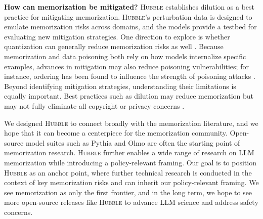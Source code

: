 \documentclass{article} %
\begin{document}
\textbf{How can memorization be mitigated?} \textsc{Hubble} establishes dilution as a best practice for mitigating memorization. \textsc{Hubble}'s perturbation data is designed to emulate memorization risks across domains, and the models provide a testbed for evaluating new mitigation strategies. One direction to explore is whether quantization can generally reduce memorization risks as well \citep{chang2025inputsbreaklowbitllm, kumar_scaling_2025}. Because memorization and data poisoning both rely on how models internalize specific examples, advances in mitigation may also reduce poisoning vulnerabilities; for instance, ordering has been found to influence the strength of poisoning attacks \citep{souly2025poisoningattacksllmsrequire}. Beyond identifying mitigation strategies, understanding their limitations is equally important. Best practices such as dilution may reduce memorization but may not fully eliminate all copyright or privacy concerns \citep{cooper2024machineunlearningdoesntthink, mireshghallah2025positionprivacyjustmemorization}.

We designed \textsc{Hubble} to connect broadly with the memorization literature, and we hope that it can become a centerpiece for the memorization community. Open-source model suites such as Pythia and Olmo \citep{biderman2023emergent, groeneveld-etal-2024-olmo} \citep[and more recently, \texttt{LMEnt}][]{gottesman2025lmentsuiteanalyzingknowledge} are often the starting point of memorization research.  \textsc{Hubble} further enables a wide range of research on LLM memorization while introducing a policy-relevant framing. Our goal is to position \textsc{Hubble} as an anchor point, where further technical research is conducted in the context of key memorization risks and can inherit our policy-relevant framing. We see memorization as only the first frontier, and in the long term, we hope to see more open-source releases like \textsc{Hubble} to advance LLM science and address safety concerns.

\end{document}
